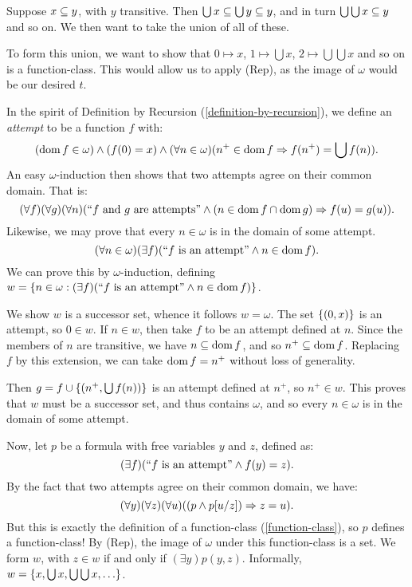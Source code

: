 \documentclass{article}
\begin{document}
\begin{prf}
    Suppose $x \subseteq y$, with $y$ transitive. Then $\bigcup x \subseteq \bigcup y \subseteq y$, and in turn $\bigcup \bigcup x \subseteq y$ and so on. We then want to take the union of all of these.
    
    To form this union, we want to show that $0 \mapsto x$, $1 \mapsto \bigcup x$, $2 \mapsto \bigcup\bigcup x$ and so on is a function-class. This would allow us to apply (Rep), as the image of $\omega$ would be our desired $t$.
    
    In the spirit of Definition by Recursion (\ref{definition-by-recursion}), we define an \textit{attempt} to be a function $f$ with:
    \[
	(\operatorname{dom} f \in \omega)
	\land
	(f(0) = x)
	\land
	(\forall n \in \omega)
	(n^+ \in \operatorname{dom} f \Rightarrow f(n^+) = \bigcup f(n)).
	\]
	An easy $\omega$-induction then shows that two attempts agree on their common domain. That is:
	\[
	(\forall f)(\forall g)(\forall n)
	(``f \text{ and } g \text{ are attempts}" \land (n \in \operatorname{dom} f \cap \operatorname{dom} g) \Rightarrow f(u) = g(u)).
	\]	
	Likewise, we may prove that every $n \in \omega$ is in the domain of some attempt.
	\[
	(\forall n \in \omega)(\exists f)(``f \text{ is an attempt}" \land n \in \operatorname{dom} f).
	\]
	We can prove this by $\omega$-induction, defining $w = \left\lbrace n \in \omega : (\exists f)(``f \text{ is an attempt}" \land n \in \operatorname{dom} f) \right\rbrace$.
	
	We show $w$ is a successor set, whence it follows $w = \omega$. The set $\left\lbrace (0, x) \right\rbrace$ is an attempt, so $0 \in w$. If $n \in w$, then take $f$ to be an attempt defined at $n$. Since the members of $n$ are transitive, we have $n \subseteq \operatorname{dom} f$, and so $n^+ \subseteq \operatorname{dom} f$. Replacing $f$ by this extension, we can take $\operatorname{dom} f = n^+$ without loss of generality.
	
	Then $g = f \cup \left\lbrace (n^+, \bigcup f(n)) \right\rbrace$ is an attempt defined at $n^+$, so $n^+ \in w$. This proves that $w$ must be a successor set, and thus contains $\omega$, and so every $n \in \omega$ is in the domain of some attempt.
	
	Now, let $p$ be a formula with free variables $y$ and $z$, defined as:
	\[
	(\exists f)(``f \text{ is an attempt}" \land f(y) = z).
	\]
	By the fact that two attempts agree on their common domain, we have:
	\[
	(\forall y)(\forall z)(\forall u)((p \land p[u/z]) \Rightarrow z = u).
	\]
	But this is exactly the definition of a function-class (\ref{function-class}), so $p$ defines a function-class! By (Rep), the image of $\omega$ under this function-class is a set. We form $w$, with $z \in w$ if and only if $(\exists y)p(y, z)$.
	Informally, $w = \set{x, \bigcup x, \bigcup \bigcup x, \dots}$.
	

\end{prf}
\end{document}
